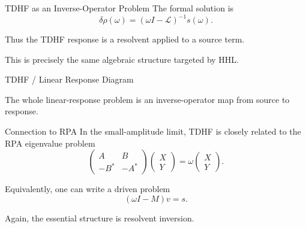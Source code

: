 \documentclass{beamer}
\begin{document}
\begin{frame}{TDHF as an Inverse-Operator Problem}
The formal solution is
\[
\delta\rho(\omega)=
(\omega I-\mathcal{L})^{-1}s(\omega).
\]

Thus the TDHF response is a resolvent applied to a source term.

This is precisely the same algebraic structure targeted by HHL.
\end{frame}


\begin{frame}{TDHF / Linear Response Diagram}
\centering
{}

\vspace{0.4cm}
The whole linear-response problem is an inverse-operator map from source to response.
\end{frame}


\begin{frame}{Connection to RPA}
In the small-amplitude limit, TDHF is closely related to the RPA eigenvalue problem
\[
\begin{pmatrix}
A & B \\
-B^* & -A^*
\end{pmatrix}
\begin{pmatrix}
X \\ Y
\end{pmatrix}
=
\omega
\begin{pmatrix}
X \\ Y
\end{pmatrix}.
\]

Equivalently, one can write a driven problem
\[
(\omega I-M)v=s.
\]

Again, the essential structure is resolvent inversion.
\end{frame}
\end{document}

